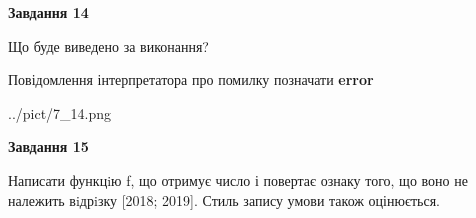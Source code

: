 \documentclass[11pt, ukrainian]{article}
\begin{document}
{\begin {large}
{\begin {center}\textbf{Завдання 14}\end {center}}\par
Що буде виведено за виконання? \par
Повідомлення інтерпретатора про помилку позначати \textbf{error}

\begin{center}
	{../pict/7_14.png}
\end{center}
\newpage

{\begin {center}\textbf{Завдання 15}\end {center}}\par

Написати функцiю f, що отримує число і повертає ознаку того, що воно не належить вiдрiзку [2018; 2019]. Стиль запису умови також оцінюється.\par
\newpage

\end {large}}
\end{document}
